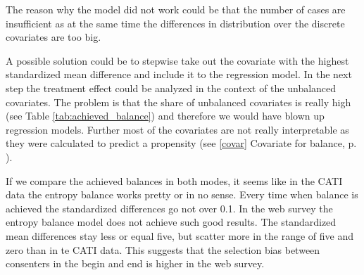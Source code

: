 The reason why the model did not work could be that the number of cases are insufficient as at the same time the differences in distribution over the discrete covariates are too big.

A possible solution could be to stepwise take out the covariate with the highest standardized mean difference and include it to the regression model. In the next step the treatment effect could be analyzed in the context of the unbalanced covariates. The problem is that the share of unbalanced covariates is really high (see Table \ref{tab:achieved_balance}) and therefore we would have blown up regression models. Further most of the covariates are not really interpretable as they were calculated to predict a propensity (see \ref{covar} Covariate for balance, p. \pageref{covar}).

If we compare the achieved balances in both modes, it seems like in the CATI data the entropy balance works pretty or in no sense. Every time when balance is achieved the standardized differences go not over 0.1. In the web survey the entropy balance model does not achieve such good results. The standardized mean differences stay less or equal five, but scatter more in the range of five and zero than in te CATI data. This suggests that the selection bias between consenters in the begin and end is higher in the web survey.

